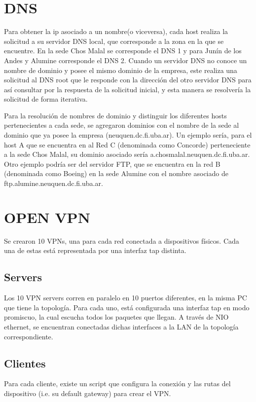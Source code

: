 \documentclass[12pt, a4paper, spanish]{article}
\begin{document}
\newpage


\newpage
\section{DNS}
Para obtener la ip asociado a un nombre(o viceversa), cada host realiza 
la solicitud a su servidor DNS local, que corresponde a la zona en la que 
se encuentre.
En la sede Chos Malal se corresponde el DNS 1 y para Junín de los Andes y 
Alumine corresponde el DNS 2.
Cuando un servidor DNS no conoce un nombre de dominio y posee el mismo 
dominio de la empresa, este realiza una solicitud al DNS root que le responde 
con la dirección del otro servidor DNS para así consultar por la respuesta de 
la solicitud inicial, y esta manera se resolvería la solicitud de forma 
iterativa.

Para la resolución de nombres de dominio y distinguir los diferentes hosts 
pertenecientes a cada sede, se agregaron dominios con el nombre de la sede 
al dominio que ya posee la empresa (neuquen.dc.fi.uba.ar).
Un ejemplo sería, para el host A que se encuentra en al Red C (denominada 
como Concorde) perteneciente a la sede Chos Malal, su dominio asociado sería 
a.chosmalal.neuquen.dc.fi.uba.ar.
Otro ejemplo podría ser del servidor FTP, que se encuentra en la red B 
(denominada como Boeing) en la sede Alumine con el nombre asociado de 
ftp.alumine.neuquen.dc.fi.uba.ar.

\section{OPEN VPN}
Se crearon 10 VPNs, una para cada red conectada a dispositivos físicos.
Cada una de estas está representada por una interfaz tap distinta.

\subsection{Servers}
Los 10 VPN servers corren en paralelo en 10 puertos diferentes, en la misma 
PC que tiene la topología.
Para cada uno, está configurada una interfaz tap en modo promiscuo, la cual 
escucha todos los paquetes que llegan.
A través de NIO ethernet, se encuentran conectadas dichas interfaces a la LAN 
de la topología correspondiente.

\subsection{Clientes}
Para cada cliente, existe un script que configura la conexión y 
las rutas del dispositivo (i.e. su default gateway) para crear el VPN.
\end{document}
